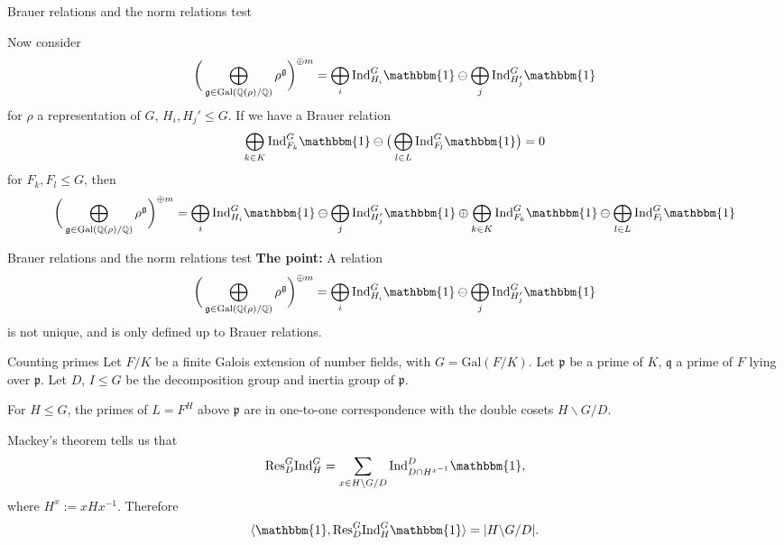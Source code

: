 \documentclass{beamer}
\newcommand{\Gal}{\mathrm{Gal}}
\newcommand{\trivial}{\mathbbm{1}}
\newcommand{\Ind}{\mathrm{Ind}}
\newcommand{\Res}{\mathrm{Res}}
\newcommand{\QQ}{\mathbb{Q}}
\newcommand{\fp}{\mathfrak{p}}
\newcommand{\fq}{\mathfrak{q}}
\theoremstyle{plain}
\begin{document}
\begin{frame}{Brauer relations and the norm relations test}
    
    Now consider 
    \[ \bigg(\bigoplus_{\mathfrak{g}\in\Gal(\QQ(\rho)/\QQ)}\rho^{\mathfrak{g}}\bigg)^{\oplus m}=\bigoplus_i\Ind_{H_i}^G\mathbbm{1}\ominus\bigoplus_j\Ind_{H'_j}^G\mathbbm{1}\] 
    for $\rho$ a representation of $G$, $H_i, H_j' \leq G$. \pause 
    If we have a Brauer relation
    \[ \bigoplus_{k \in K} \Ind_{F_k}^G \trivial \ominus \big{(}\bigoplus_{l \in L} \Ind_{F_l}^G \trivial\big{)} = 0 \] 
    for $F_k, F_l \leq G$, \pause then 
    \small{\[ \bigg(\bigoplus_{\mathfrak{g}\in\Gal(\QQ(\rho)/\QQ)}\rho^{\mathfrak{g}}\bigg)^{\oplus m}=\bigoplus_i\Ind_{H_i}^G\mathbbm{1}\ominus\bigoplus_j\Ind_{H'_j}^G\mathbbm{1} \oplus \bigoplus_{k \in K} \Ind_{F_k}^G \trivial \ominus \bigoplus_{l \in L} \Ind_{F_l}^G \trivial \]}
\end{frame}

\begin{frame}{Brauer relations and the norm relations test}
\textbf{The point:} A relation  
\[ \bigg(\bigoplus_{\mathfrak{g}\in\Gal(\QQ(\rho)/\QQ)}\rho^{\mathfrak{g}}\bigg)^{\oplus m}=\bigoplus_i\Ind_{H_i}^G\mathbbm{1}\ominus\bigoplus_j\Ind_{H'_j}^G\mathbbm{1}\]
is not unique, and is only defined up to Brauer relations.
\end{frame}

\begin{frame}{Counting primes}
    Let $F / K$ be a finite Galois extension of number fields, with $G = \Gal(F / K)$. \pause Let $\fp$ be a prime of $K$, $\fq$ a prime of $F$ lying over $\fp$. Let $D$, $I \leq G$ be the decomposition group and inertia group of $\fp$. \pause 
    
    \begin{lemma}    
    For $H \leq G$, the primes of $L = F^H$ above $\fp$ are in one-to-one correspondence with the double cosets $H  \backslash G / D$. 
    \end{lemma} \pause

    \vspace{1em}
    Mackey's theorem tells us that 
    \[ \Res_D^G \Ind_H^G = \sum_{x \in H\backslash G / D} \Ind_{D \cap H^{x^{-1}}}^D \trivial, \]
    where $H^x := x H x^{-1}$. \pause Therefore
    \[ \langle \trivial, \Res_D^G \Ind_H^G \trivial \rangle = | H \backslash G / D|.\]
\end{frame}
\end{document}
